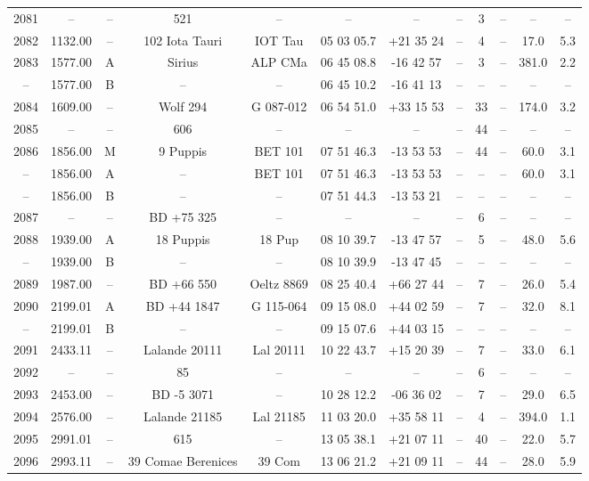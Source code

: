 \begin{table}
\begin{tabular}{cccccccccccc}
2081 & -- & -- & 521 & -- & -- & -- & -- & 3 & -- & -- & -- \\
2082 & 1132.00 & -- & 102 Iota Tauri & IOT Tau & 05 03 05.7 & +21 35 24 & -- & 4 & -- & 17.0 & 5.3 \\
2083 & 1577.00 & A & Sirius & ALP CMa & 06 45 08.8 & -16 42 57 & -- & 3 & -- & 381.0 & 2.2 \\
-- & 1577.00 & B & -- & -- & 06 45 10.2 & -16 41 13 & -- & -- & -- & -- & -- \\
2084 & 1609.00 & -- & Wolf 294 & G 087-012 & 06 54 51.0 & +33 15 53 & -- & 33 & -- & 174.0 & 3.2 \\
2085 & -- & -- & 606 & -- & -- & -- & -- & 44 & -- & -- & -- \\
2086 & 1856.00 & M & 9 Puppis & BET 101 & 07 51 46.3 & -13 53 53 & -- & 44 & -- & 60.0 & 3.1 \\
-- & 1856.00 & A & -- & BET 101 & 07 51 46.3 & -13 53 53 & -- & -- & -- & 60.0 & 3.1 \\
-- & 1856.00 & B & -- & -- & 07 51 44.3 & -13 53 21 & -- & -- & -- & -- & -- \\
2087 & -- & -- & BD +75 325 & -- & -- & -- & -- & 6 & -- & -- & -- \\
2088 & 1939.00 & A & 18 Puppis & 18 Pup & 08 10 39.7 & -13 47 57 & -- & 5 & -- & 48.0 & 5.6 \\
-- & 1939.00 & B & -- & -- & 08 10 39.9 & -13 47 45 & -- & -- & -- & -- & -- \\
2089 & 1987.00 & -- & BD +66 550 & Oeltz 8869 & 08 25 40.4 & +66 27 44 & -- & 7 & -- & 26.0 & 5.4 \\
2090 & 2199.01 & A & BD +44 1847 & G 115-064 & 09 15 08.0 & +44 02 59 & -- & 7 & -- & 32.0 & 8.1 \\
-- & 2199.01 & B & -- & -- & 09 15 07.6 & +44 03 15 & -- & -- & -- & -- & -- \\
2091 & 2433.11 & -- & Lalande 20111 & Lal 20111 & 10 22 43.7 & +15 20 39 & -- & 7 & -- & 33.0 & 6.1 \\
2092 & -- & -- & 85 & -- & -- & -- & -- & 6 & -- & -- & -- \\
2093 & 2453.00 & -- & BD -5 3071 & -- & 10 28 12.2 & -06 36 02 & -- & 7 & -- & 29.0 & 6.5 \\
2094 & 2576.00 & -- & Lalande 21185 & Lal 21185 & 11 03 20.0 & +35 58 11 & -- & 4 & -- & 394.0 & 1.1 \\
2095 & 2991.01 & -- & 615 & -- & 13 05 38.1 & +21 07 11 & -- & 40 & -- & 22.0 & 5.7 \\
2096 & 2993.11 & -- & 39 Comae Berenices & 39 Com & 13 06 21.2 & +21 09 11 & -- & 44 & -- & 28.0 & 5.9 \\

\end{tabular}
\end{table}
